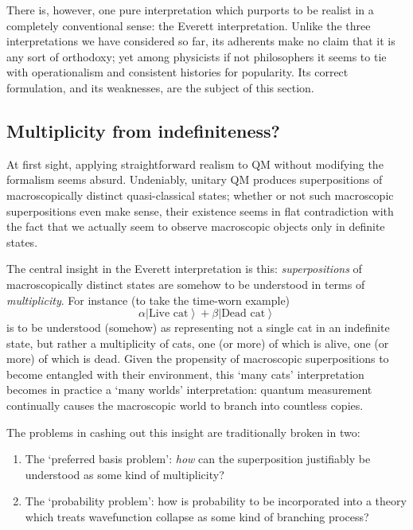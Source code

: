 \documentclass[12pt]{article}
\newcommand{\be}{\begin{equation}}
\newcommand{\ee}{\end{equation}}
\newcommand{\ket}[1]{\ensuremath{\left|  #1 \right\rangle}}
\begin{document}
There is, however, one pure interpretation which purports to be realist in a completely conventional sense: the Everett interpretation. Unlike the three interpretations we have considered so far, its adherents make no claim that it is any sort of orthodoxy; yet among physicists if not philosophers it seems to tie with operationalism and consistent histories for popularity. Its correct formulation, and its weaknesses, are the subject of this section.

\subsection{Multiplicity from indefiniteness?}

At first sight, applying straightforward realism to QM without modifying the formalism seems absurd. Undeniably, unitary QM produces superpositions of macroscopically distinct quasi-classical states; whether or not such macroscopic superpositions even make sense, their existence seems in flat contradiction with the fact that we actually seem to observe macroscopic objects only in definite states.

The central insight in the Everett interpretation is this: \emph{superpositions} of macroscopically distinct states are somehow to be understood in terms of \emph{multiplicity}. For instance (to take the time-worn example)
\be \label{DMWWschrodingercat}\alpha\ket{\mathrm{\mbox{Live cat}}}+\beta\ket{\mathrm{\mbox{Dead cat}}}\ee
is to be understood (somehow) as representing not a single cat in an indefinite state, but rather  a multiplicity of cats, one (or more) of which is alive, one (or more) of which is dead. Given the propensity of macroscopic superpositions to become entangled with their environment, this `many cats' interpretation becomes in practice a `many worlds' interpretation: quantum measurement continually causes the macroscopic world to branch into countless copies.

The problems in cashing out this insight are traditionally broken in two:
\begin{enumerate}
\item The `preferred basis problem': \emph{how} can the superposition justifiably be understood as some kind of multiplicity?
\item The `probability problem': how is probability to be incorporated into a theory which treats wavefunction collapse as some kind of branching process?
\end{enumerate}
\end{document}
